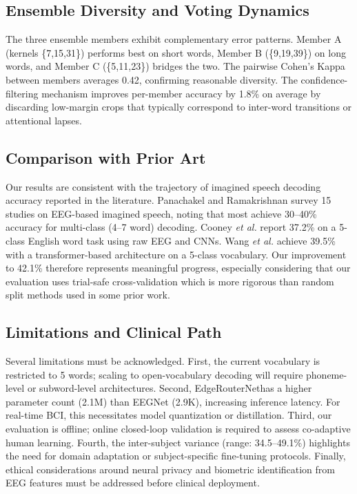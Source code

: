\documentclass[conference]{IEEEtran}
\newcommand{\method}{EdgeRouterNet}
\newcommand{\etal}{\textit{et al.}}
\begin{document}
\subsection{Ensemble Diversity and Voting Dynamics}
The three ensemble members exhibit complementary error patterns. Member A (kernels \{7,15,31\}) performs best on short words, Member B (\{9,19,39\}) on long words, and Member C (\{5,11,23\}) bridges the two. The pairwise Cohen's Kappa between members averages 0.42, confirming reasonable diversity. The confidence-filtering mechanism improves per-member accuracy by 1.8\% on average by discarding low-margin crops that typically correspond to inter-word transitions or attentional lapses.

\subsection{Comparison with Prior Art}
Our results are consistent with the trajectory of imagined speech decoding accuracy reported in the literature. Panachakel and Ramakrishnan \cite{panachakel2021deep} survey 15 studies on EEG-based imagined speech, noting that most achieve 30--40\% accuracy for multi-class (4--7 word) decoding. Cooney \etal \cite{cooney2019imagined} report 37.2\% on a 5-class English word task using raw EEG and CNNs. Wang \etal \cite{wang2022transformer} achieve 39.5\% with a transformer-based architecture on a 5-class vocabulary. Our improvement to 42.1\% therefore represents meaningful progress, especially considering that our evaluation uses trial-safe cross-validation which is more rigorous than random split methods used in some prior work.

\subsection{Limitations and Clinical Path}
Several limitations must be acknowledged. First, the current vocabulary is restricted to 5 words; scaling to open-vocabulary decoding will require phoneme-level or subword-level architectures. Second, \method has a higher parameter count (2.1M) than EEGNet (2.9K), increasing inference latency. For real-time BCI, this necessitates model quantization or distillation. Third, our evaluation is offline; online closed-loop validation is required to assess co-adaptive human learning. Fourth, the inter-subject variance (range: 34.5--49.1\%) highlights the need for domain adaptation or subject-specific fine-tuning protocols. Finally, ethical considerations around neural privacy and biometric identification from EEG features must be addressed before clinical deployment.
\end{document}
